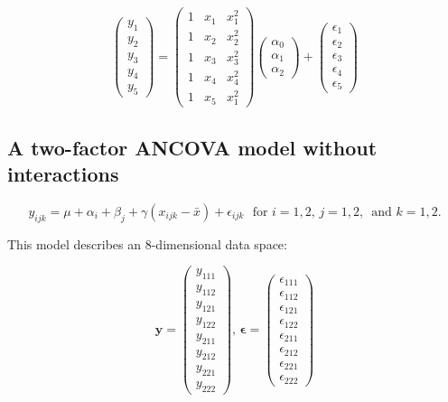 \documentclass[11pt]{article}
\begin{document}
$$\begin{pmatrix} y_1 \\ y_2 \\ y_3
\\ y_4\\ y_5\end{pmatrix} = \begin{pmatrix} 1 & x_1 & x_1^2 \\ 
                            1 & x_2 & x_2^2 \\ 
                            1 & x_3 & x_3^2 \\ 
                            1 & x_4 & x_4^2 \\ 
                            1 & x_5 & x_1^2 \end{pmatrix} \begin{pmatrix} \alpha_0 \\ \alpha_1 \\ \alpha_2
\end{pmatrix} + \begin{pmatrix} \epsilon_1 \\ \epsilon_2 \\
\epsilon_3 \\ \epsilon_4 \\ \epsilon_5 \end{pmatrix}$$
\subsection{A two-factor ANCOVA model without interactions}
\label{sec-1-2}

$$y_{ijk} = \mu + \alpha_i + \beta_j + \gamma(x_{ijk} - \bar{x}) +
\epsilon_{ijk}\,\, \textrm{ for } i= 1, 2,\,j=1,2,\,\textrm{ and }k =1,2.$$

This model describes an 8-dimensional data space:

$$\mathbf{y} = \begin{pmatrix} y_{111} \\ y_{112} \\  y_{121}
\\ y_{122} \\ y_{211} \\ y_{212} \\ y_{221} \\ y_{222}
\end{pmatrix},\, 
\mathbf{\epsilon} = \begin{pmatrix} \epsilon_{111} \\ \epsilon_{112} \\  \epsilon_{121}
\\ \epsilon_{122} \\ \epsilon_{211} \\ \epsilon_{212} \\ \epsilon_{221} \\ \epsilon_{222} \end{pmatrix}$$
\end{document}
